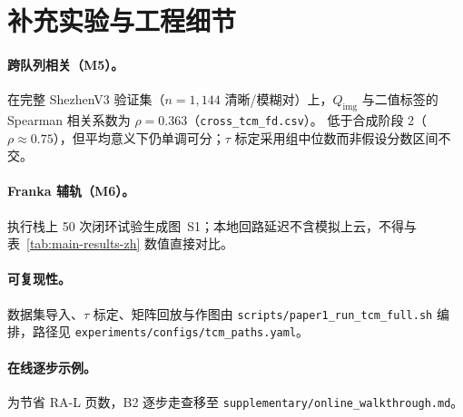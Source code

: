 \section{补充实验与工程细节}
\label{sec:app-experiments-zh}

\paragraph{跨队列相关（M5）。}
在完整 ShezhenV3 验证集（$n{=}1{,}144$ 清晰/模糊对）上，$Q_{\mathrm{img}}$ 与二值标签的 Spearman 相关系数为 $\rho{=}0.363$（\texttt{cross\_tcm\_fd.csv}）。
低于合成阶段 2（$\rho{\approx}0.75$），但平均意义下仍单调可分；$\tau$ 标定采用组中位数而非假设分数区间不交。

\paragraph{Franka 辅轨（M6）。}
执行栈上 50 次闭环试验生成图~S1；本地回路延迟不含模拟上云，不得与表~\ref{tab:main-results-zh} 数值直接对比。

\paragraph{可复现性。}
数据集导入、$\tau$ 标定、矩阵回放与作图由 \texttt{scripts/paper1\_run\_tcm\_full.sh} 编排，路径见 \texttt{experiments/configs/tcm\_paths.yaml}。










\paragraph{在线逐步示例。}
为节省 RA-L 页数，B2 逐步走查移至 \texttt{supplementary/online\_walkthrough.md}。
